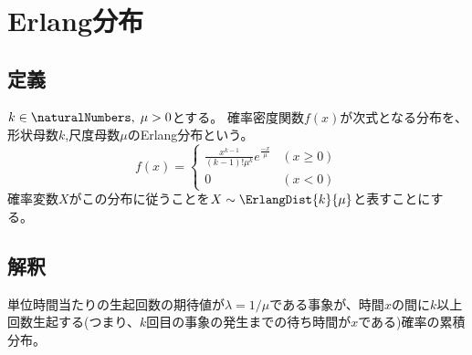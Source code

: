 \chapter{Erlang分布}
    \section{定義}
        $k\in\naturalNumbers,\;\mu>0$とする。
        確率密度関数$f(x)$が次式となる分布を、形状母数$k$,尺度母数$\mu$のErlang分布という。
        \[
            f(x) =
            \begin{cases}
                \frac{x^{k-1}}{(k-1)!\mu^k}e^\frac{-x}{\mu} & (x\geq 0) \\
                0 & (x<0)
            \end{cases}
        \]
        確率変数$X$がこの分布に従うことを$X \sim \ErlangDist{k}{\mu}$と表すことにする。
    \section{解釈}
        単位時間当たりの生起回数の期待値が$\lambda = 1/\mu$である事象が、時間$x$の間に$k$以上回数生起する(つまり、$k$回目の事象の発生までの待ち時間が$x$である)確率の累積分布。
